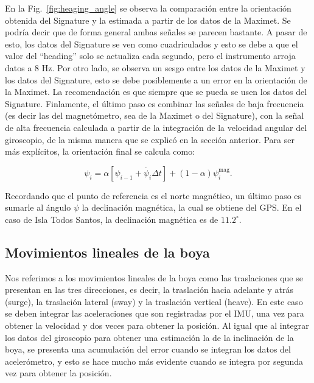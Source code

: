 \documentclass[11pt]{article}
\begin{document}
En la Fig.~\ref{fig:heaging_angle} se observa la comparación entre la
orientación obtenida del Signature y la estimada a partir de los datos de la
Maximet. Se podría decir que de forma general ambas señales se parecen bastante.
A pasar de esto, los datos del Signature se ven como cuadriculados y esto se
debe a que el valor del ``heading'' solo se actualiza cada segundo, pero el
instrumento arroja datos a 8 Hz. Por otro lado, se observa un sesgo entre los
datos de la Maximet y los datos del Signature, esto se debe posiblemente a un
error en la orientación de la Maximet. La recomendación es que siempre que se
pueda se usen los datos del Signature. Finlamente, el último paso es combinar
las señales de baja frecuencia (es decir las del magnetómetro, sea de la Maximet
o del Signature), con la señal de alta frecuencia calculada a partir de la
integración de la velocidad angular del giroscopio, de la misma manera que se
explicó en la sección anterior. Para ser más explícitos, la orientación final se
calcula como:

\begin{equation}
  \psi_{i} = \alpha \left[\psi_{i-1} + \dot{\psi_{i}} \Delta t \right] +
  (1-\alpha) \psi^\mathrm{mag}_{i}.
\end{equation}

Recordando que el punto de referencia es el norte magnético, un último paso es
sumarle al ángulo $\psi$ la declinación magnética, la cual se obtiene del GPS.
En el caso de Isla Todos Santos, la declinación magnética es de $11.2^\circ$.


\subsection{Movimientos lineales de la boya}

Nos referimos a los movimientos lineales de la boya como las traslaciones que
se presentan en las tres direcciones, es decir, la traslación hacia adelante y
atrás (surge), la traslación lateral (sway) y la traslación vertical (heave). En
este caso se deben integrar las aceleraciones que son registradas por el IMU,
una vez para obtener la velocidad y dos veces para obtener la posición.
Al igual que al integrar los datos del giroscopio para obtener una estimación la
de la inclinación de la boya, se presenta una acumulación del error cuando se
integran los datos del acelerómetro, y esto se hace mucho más evidente cuando se
integra por segunda vez para obtener la posición.
\end{document}

